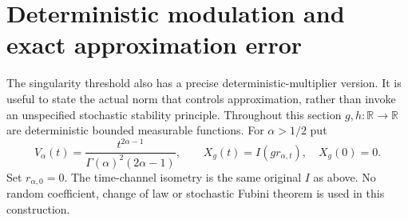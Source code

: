 \documentclass[11pt]{article}
\newcommand{\R}{\mathbb R}\newcommand{\E}{\mathbb E}
\begin{document}
\section{Deterministic modulation and exact approximation error}
The singularity threshold also has a precise deterministic-multiplier
version. It is useful to state the actual norm that controls
approximation, rather than invoke an unspecified stochastic stability
principle. Throughout this section $g,h:\R\to\R$ are deterministic
bounded measurable functions. For $\alpha>1/2$ put
\[
 V_\alpha(t)=\frac{t^{2\alpha-1}}{\Gamma(\alpha)^2(2\alpha-1)},
 \qquad X_g(t)=I(g r_{\alpha,t}),\quad X_g(0)=0.
\]
Set $r_{\alpha,0}=0$. The time-channel isometry is the same original $I$ as above. No
random coefficient, change of law or stochastic Fubini theorem is
used in this construction.
\end{document}
